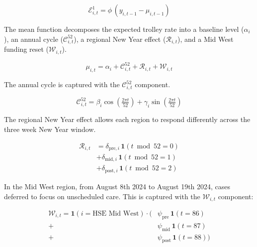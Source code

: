 \documentclass[
]{article}
\begin{document}
\begin{equation}
\mathcal{E}^{1}_{i,t} = \phi\,(y_{i,t-1} - \mu_{i,t-1})
\label{eq:base-ar1}
\end{equation}

The mean function decomposes the expected trolley rate into a baseline level (\(\alpha_i\)), an annual cycle (\(\mathcal{C}_{i,t}^{52}\)), a regional New Year effect (\(\mathcal{R}_{i,t}\)), and a Mid West funding reset (\(\mathcal{W}_{i,t}\)).

\begin{equation}
\mu_{i,t} = \alpha_i + \mathcal{C}_{i,t}^{52} + \mathcal{R}_{i,t} + \mathcal{W}_{i,t}
\label{eq:base-mean}
\end{equation}

The annual cycle is captured with the \(\mathcal{C}_{i,t}^{52}\) component.

\begin{equation}
\mathcal{C}_{i,t}^{52} = \beta_i \cos\!\left(\tfrac{2\pi t}{52}\right) + \gamma_i \sin\!\left(\tfrac{2\pi t}{52}\right)
\end{equation}

The regional New Year effect allows each region to respond differently across the three week New Year window.

\begin{equation}
\begin{aligned}
\mathcal{R}_{i,t} &= \delta_{\text{pre},i}\,\mathbf{1}(t \bmod 52 = 0) \\
                  &+ \delta_{\text{mid},i}\,\mathbf{1}(t \bmod 52 = 1) \\
                  &+ \delta_{\text{post},i}\,\mathbf{1}(t \bmod 52 = 2)
\end{aligned}
\label{eq:base-newyear}
\end{equation}

In the Mid West region, from August 8th 2024 to August 19th 2024, cases deferred to focus on unscheduled care.
This is captured with the \(\mathcal{W}_{i,t}\) component:

\begin{equation}
\begin{aligned}
\mathcal{W}_{i,t} = \mathbf{1}(i = \text{HSE Mid West})\cdot\bigl(&\psi_{\text{pre}}\,\mathbf{1}(t = 86) \\
  +\,&\psi_{\text{mid}}\,\mathbf{1}(t = 87) \\
  +\,&\psi_{\text{post}}\,\mathbf{1}(t = 88)\bigr)
\end{aligned}
\label{eq:base-mwreset}
\end{equation}
\end{document}

